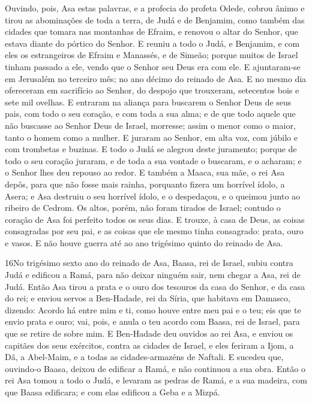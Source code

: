 Ouvindo, pois, Asa estas palavras, e a profecia do profeta Odede,
cobrou ânimo e tirou as abominações de toda a terra, de Judá e de
Benjamim, como também das cidades que tomara nas montanhas de
Efraim, e renovou o altar do Senhor, que estava diante do pórtico do
Senhor. E reuniu a todo o Judá, e Benjamim, e com eles os
estrangeiros de Efraim e Manassés, e de Simeão; porque muitos de
Israel tinham passado a ele, vendo que o Senhor seu Deus era com
ele. E ajuntaram-se em Jerusalém no terceiro mês; no ano
décimo do reinado de Asa. E no mesmo dia ofereceram em
sacrifício ao Senhor, do despojo que trouxeram, setecentos bois e
sete mil ovelhas. E entraram na aliança para buscarem o
Senhor Deus de seus pais, com todo o seu coração, e com toda a sua
alma; e de que todo aquele que não buscasse ao Senhor Deus de
Israel, morresse; assim o menor como o maior, tanto o homem como a
mulher. E juraram ao Senhor, em alta voz, com júbilo e com
trombetas e buzinas. E todo o Judá se alegrou deste
juramento; porque de todo o seu coração juraram, e de toda a sua
vontade o buscaram, e o acharam; e o Senhor lhes deu repouso ao
redor. E também a Maaca, sua mãe, o rei Asa depôs, para que
não fosse mais rainha, porquanto fizera um horrível ídolo, a Asera;
e Asa destruiu o seu horrível ídolo, e o despedaçou, e o queimou
junto ao ribeiro de Cedrom. Os altos, porém, não foram
tirados de Israel; contudo o coração de Asa foi perfeito todos os
seus dias. E trouxe, à casa de Deus, as coisas consagradas
por seu pai, e as coisas que ele mesmo tinha consagrado: prata, ouro
e vasos. E não houve guerra até ao ano trigésimo quinto do
reinado de Asa.

\medskip

\lettrine{16} No trigésimo sexto ano do reinado de Asa, Baasa,
rei de Israel, subiu contra Judá e edificou a Ramá, para não deixar
ninguém sair, nem chegar a Asa, rei de Judá. Então Asa tirou a
prata e o ouro dos tesouros da casa do Senhor, e da casa do rei; e
enviou servos a Ben-Hadade, rei da Síria, que habitava em Damasco,
dizendo: Acordo há entre mim e ti, como houve entre meu pai e o
teu; eis que te envio prata e ouro; vai, pois, e anula o teu acordo
com Baasa, rei de Israel, para que se retire de sobre mim. E
Ben-Hadade deu ouvidos ao rei Asa, e enviou os capitães dos seus
exércitos, contra as cidades de Israel, e eles feriram a Ijom, a Dã,
a Abel-Maim, e a todas as cidades-armazéns de Naftali. E sucedeu
que, ouvindo-o Baasa, deixou de edificar a Ramá, e não continuou a
sua obra. Então o rei Asa tomou a todo o Judá, e levaram as
pedras de Ramá, e a sua madeira, com que Baasa edificara; e com elas
edificou a Geba e a Mizpá.

